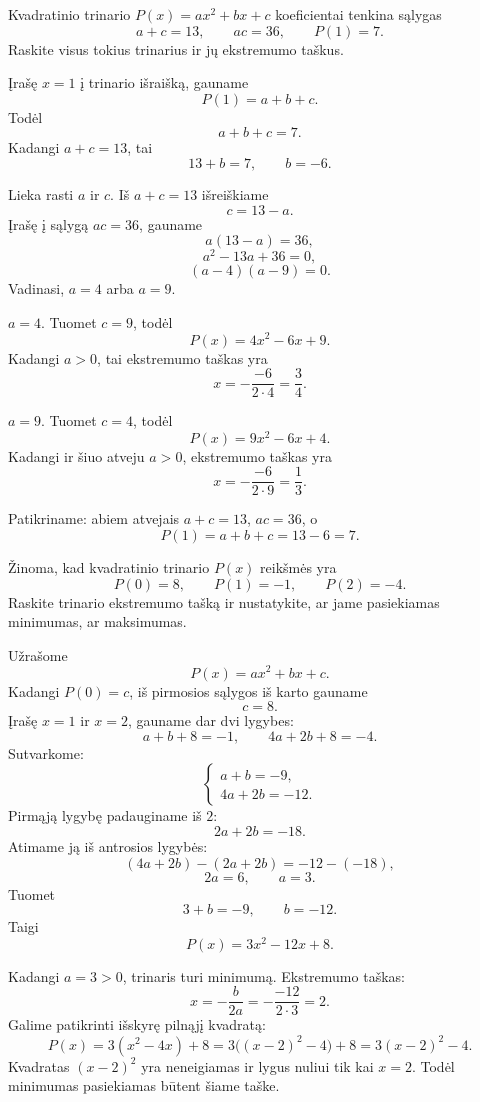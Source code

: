 \documentclass[11pt,a4paper]{scrartcl}
\numberwithin{exercise}{section}
\begin{document}
\begin{example}\label{pv:sunk_koeficientu_rysiai}
Kvadratinio trinario $P(x)=ax^2+bx+c$ koeficientai tenkina sąlygas
\[
a+c=13,\qquad ac=36,\qquad P(1)=7.
\]
Raskite visus tokius trinarius ir jų ekstremumo taškus.
\end{example}

\begin{solution}
Įrašę $x=1$ į trinario išraišką, gauname
\[
P(1)=a+b+c.
\]
Todėl
\[
a+b+c=7.
\]
Kadangi $a+c=13$, tai
\[
13+b=7,\qquad b=-6.
\]

Lieka rasti $a$ ir $c$. Iš $a+c=13$ išreiškiame
\[
c=13-a.
\]
Įrašę į sąlygą $ac=36$, gauname
\[
a(13-a)=36,
\]
\[
a^2-13a+36=0,
\]
\[
(a-4)(a-9)=0.
\]
Vadinasi, $a=4$ arba $a=9$.

 $a=4$. Tuomet $c=9$, todėl
\[
P(x)=4x^2-6x+9.
\]
Kadangi $a>0$, tai ekstremumo taškas yra
\[
x=-\frac{-6}{2\cdot4}=\frac34.
\]

 $a=9$. Tuomet $c=4$, todėl
\[
P(x)=9x^2-6x+4.
\]
Kadangi ir šiuo atveju $a>0$, ekstremumo taškas yra
\[
x=-\frac{-6}{2\cdot9}=\frac13.
\]

Patikriname: abiem atvejais $a+c=13$, $ac=36$, o
\[
P(1)=a+b+c=13-6=7.
\]

\end{solution}

\begin{example}\label{pv:sunk_trys_reiksmes}
Žinoma, kad kvadratinio trinario $P(x)$ reikšmės yra
\[
P(0)=8,\qquad P(1)=-1,\qquad P(2)=-4.
\]
Raskite trinario ekstremumo tašką ir nustatykite,
ar jame pasiekiamas minimumas, ar maksimumas.
\end{example}

\begin{solution}
Užrašome
\[
P(x)=ax^2+bx+c.
\]
Kadangi $P(0)=c$, iš pirmosios sąlygos iš karto gauname
\[
c=8.
\]
Įrašę $x=1$ ir $x=2$, gauname dar dvi lygybes:
\[
a+b+8=-1,
\qquad
4a+2b+8=-4.
\]
Sutvarkome:
\[
\begin{cases}
a+b=-9,\\
4a+2b=-12.
\end{cases}
\]
Pirmąją lygybę padauginame iš $2$:
\[
2a+2b=-18.
\]
Atimame ją iš antrosios lygybės:
\[
(4a+2b)-(2a+2b)=-12-(-18),
\]
\[
2a=6,\qquad a=3.
\]
Tuomet
\[
3+b=-9,\qquad b=-12.
\]
Taigi
\[
P(x)=3x^2-12x+8.
\]

Kadangi $a=3>0$, trinaris turi minimumą. Ekstremumo taškas:
\[
x=-\frac{b}{2a}
=-\frac{-12}{2\cdot3}=2.
\]
Galime patikrinti išskyrę pilnąjį kvadratą:
\[
P(x)=3(x^2-4x)+8
=3\bigl((x-2)^2-4\bigr)+8
=3(x-2)^2-4.
\]
Kvadratas $(x-2)^2$ yra neneigiamas ir lygus nuliui tik kai $x=2$.
Todėl minimumas pasiekiamas būtent šiame taške.

\end{solution}
\end{document}
